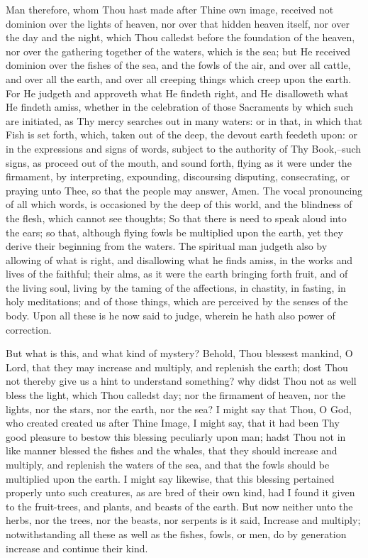 \documentclass[b5paper,openright,12pt,twoside]{book}
\begin{document}
Man therefore, whom Thou hast made after Thine own image, received not
dominion over the lights of heaven, nor over that hidden heaven
itself, nor over the day and the night, which Thou calledst before the
foundation of the heaven, nor over the gathering together of the waters,
which is the sea; but He received dominion over the fishes of the sea,
and the fowls of the air, and over all cattle, and over all the earth,
and over all creeping things which creep upon the earth. For He judgeth
and approveth what He findeth right, and He disalloweth what He findeth
amiss, whether in the celebration of those Sacraments by which such
are initiated, as Thy mercy searches out in many waters: or in that, in
which that Fish is set forth, which, taken out of the deep, the devout
earth feedeth upon: or in the expressions and signs of words, subject to
the authority of Thy Book,--such signs, as proceed out of the mouth,
and sound forth, flying as it were under the firmament, by interpreting,
expounding, discoursing disputing, consecrating, or praying unto Thee,
so that the people may answer, Amen. The vocal pronouncing of all which
words, is occasioned by the deep of this world, and the blindness of the
flesh, which cannot see thoughts; So that there is need to speak aloud
into the ears; so that, although flying fowls be multiplied upon the
earth, yet they derive their beginning from the waters. The spiritual
man judgeth also by allowing of what is right, and disallowing what he
finds amiss, in the works and lives of the faithful; their alms, as it
were the earth bringing forth fruit, and of the living soul, living
by the taming of the affections, in chastity, in fasting, in holy
meditations; and of those things, which are perceived by the senses of
the body. Upon all these is he now said to judge, wherein he hath also
power of correction.

But what is this, and what kind of mystery? Behold, Thou blessest
mankind, O Lord, that they may increase and multiply, and replenish the
earth; dost Thou not thereby give us a hint to understand something? why
didst Thou not as well bless the light, which Thou calledst day; nor the
firmament of heaven, nor the lights, nor the stars, nor the earth, nor
the sea? I might say that Thou, O God, who created created us after
Thine Image, I might say, that it had been Thy good pleasure to bestow
this blessing peculiarly upon man; hadst Thou not in like manner blessed
the fishes and the whales, that they should increase and multiply, and
replenish the waters of the sea, and that the fowls should be multiplied
upon the earth. I might say likewise, that this blessing pertained
properly unto such creatures, as are bred of their own kind, had I found
it given to the fruit-trees, and plants, and beasts of the earth. But
now neither unto the herbs, nor the trees, nor the beasts, nor serpents
is it said, Increase and multiply; notwithstanding all these as well as
the fishes, fowls, or men, do by generation increase and continue their
kind.
\end{document}
